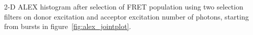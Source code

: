 \label{fig:alex_jointplot_fretsel} 2-D ALEX histogram after selection of FRET population using two selection filters on donor excitation and acceptor excitation number of photons, starting from bursts in figure~\ref{fig:alex_jointplot}.
